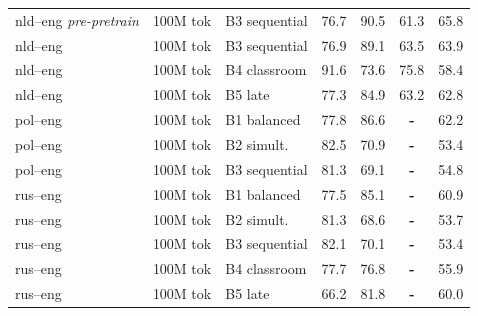 \begin{table}[t]
\begin{tabular}{lll cc cc}
nld--eng {\scriptsize\textit{pre-pretrain}} & 100M tok & B3 sequential & \cellcolor[rgb]{0.852,1.000,0.852} 76.7 & \cellcolor[rgb]{0.779,1.000,0.779} 90.5 & \cellcolor[rgb]{0.920,1.000,0.920} 61.3 & \cellcolor[rgb]{0.870,1.000,0.870} 65.8 \\
nld--eng  & 100M tok & B3 sequential & \cellcolor[rgb]{0.851,1.000,0.851} 76.9 & \cellcolor[rgb]{0.787,1.000,0.787} 89.1 & \cellcolor[rgb]{0.904,1.000,0.904} 63.5 & \cellcolor[rgb]{0.886,1.000,0.886} 63.9 \\
nld--eng & 100M tok & B4 classroom & \cellcolor[rgb]{0.770,1.000,0.770} 91.6 & \cellcolor[rgb]{0.871,1.000,0.871} 73.6 & \cellcolor[rgb]{0.817,1.000,0.817} 75.8 & \cellcolor[rgb]{0.931,1.000,0.931} 58.4 \\
nld--eng  & 100M tok & B5 late & \cellcolor[rgb]{0.849,1.000,0.849} 77.3 & \cellcolor[rgb]{0.810,1.000,0.810} 84.9 & \cellcolor[rgb]{0.906,1.000,0.906} 63.2 & \cellcolor[rgb]{0.895,1.000,0.895} 62.8 \\
pol--eng & 100M tok & B1 balanced & \cellcolor[rgb]{0.846,1.000,0.846} 77.8 & \cellcolor[rgb]{0.800,1.000,0.800} 86.6 & \textbf{-} & \cellcolor[rgb]{0.900,1.000,0.900} 62.2 \\
pol--eng & 100M tok & B2 simult. & \cellcolor[rgb]{0.820,1.000,0.820} 82.5 & \cellcolor[rgb]{0.886,1.000,0.886} 70.9 & \textbf{-} & \cellcolor[rgb]{0.972,1.000,0.972} 53.4 \\
pol--eng & 100M tok & B3 sequential & \cellcolor[rgb]{0.827,1.000,0.827} 81.3 & \cellcolor[rgb]{0.896,1.000,0.896} 69.1 & \textbf{-} & \cellcolor[rgb]{0.960,1.000,0.960} 54.8 \\
rus--eng & 100M tok & B1 balanced & \cellcolor[rgb]{0.848,1.000,0.848} 77.5 & \cellcolor[rgb]{0.809,1.000,0.809} 85.1 & \textbf{-} & \cellcolor[rgb]{0.910,1.000,0.910} 60.9 \\
rus--eng & 100M tok & B2 simult. & \cellcolor[rgb]{0.827,1.000,0.827} 81.3 & \cellcolor[rgb]{0.899,1.000,0.899} 68.6 & \textbf{-} & \cellcolor[rgb]{0.970,1.000,0.970} 53.7 \\
rus--eng & 100M tok & B3 sequential & \cellcolor[rgb]{0.822,1.000,0.822} 82.1 & \cellcolor[rgb]{0.890,1.000,0.890} 70.1 & \textbf{-} & \cellcolor[rgb]{0.972,1.000,0.972} 53.4 \\
rus--eng  & 100M tok & B4 classroom & \cellcolor[rgb]{0.847,1.000,0.847} 77.7 & \cellcolor[rgb]{0.854,1.000,0.854} 76.8 & \textbf{-} & \cellcolor[rgb]{0.951,1.000,0.951} 55.9 \\
rus--eng  & 100M tok & B5 late & \cellcolor[rgb]{0.910,1.000,0.910} 66.2 & \cellcolor[rgb]{0.827,1.000,0.827} 81.8 & \textbf{-} & \cellcolor[rgb]{0.918,1.000,0.918} 60.0 \\

\end{tabular}
\end{table}
